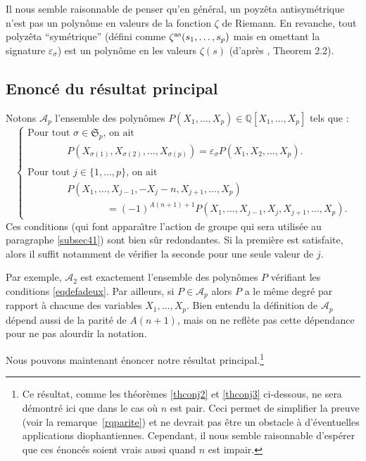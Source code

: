 \documentclass[12pt,francais, reqno]{smfart}
\numberwithin{equation}{section}
\newcommand{\Q}{\mathbb Q}
\newcommand{\eps}{\varepsilon}
\newcommand{\unp}{\{1,\ldots, p\}}
\newcommand{\zetaantisym}{\zeta^{{\rm as}}}
\begin{document}
\bigskip

Il nous semble raisonnable de penser qu'en g\'en\'eral, un poyz\^eta antisym\'etrique n'est pas un polyn\^ome en valeurs de la fonction $\zeta$ de Riemann. En revanche, tout polyz\^eta ``sym\'etrique'' (d\'efini comme $ \zetaantisym (s_1, \ldots, s_p)$ mais en omettant la signature $ \eps_{\sigma} $)
est un polyn\^ome en les valeurs $\zeta(s)$ (d'apr\`es \cite{Hoffman1992}, Theorem 2.2). 

\subsection{Enonc\'e du r\'esultat principal} \label{subsec22}

Notons   $\mathscr{A}_p$   l'ensemble des polyn\^omes 
$P(X_1, \ldots, X_p)\in\Q[X_1, \ldots, X_p]$  tels que :
$$
\begin{cases}
\mbox{Pour tout } \sigma \in\mathfrak{S}_p \mbox{,  on ait }  
\\
\qquad \qquad 
P(X_{\sigma(1)}, X_{\sigma(2)},\ldots, X_{\sigma(p)}) = \eps_{\sigma} P(X_1, X_2, \ldots, X_p). 
\\
\\
\mbox{Pour tout } j \in \unp \mbox{,  on ait}
\\ 
\qquad \qquad  P(X_1,\ldots, X_{j-1}, -X_j-n, X_{j+1}, \ldots, X_p ) 
\\
\qquad \qquad \qquad \qquad = (-1)^{A(n+1)+1} P( X_1,\ldots, X_{j-1}, X_j, X_{j+1}, \ldots, X_p ).
\end{cases}
$$
Ces conditions (qui font appara\^{\i}tre l'action de groupe qui sera utilis\'ee au paragraphe \ref{subsec41}) sont bien s\^ur redondantes. Si la premi\`ere est satisfaite, alors il suffit notamment  de v\'erifier la seconde pour une seule valeur  de $j$.

Par exemple, $\mathscr{A}_2$ est exactement l'ensemble des polyn\^omes $P$  v\'erifiant les conditions \eqref{eqdefadeux}. 
Par ailleurs, si $P \in \mathscr{A}_p$ alors $P$ a le m\^eme degr\'e par rapport \`a chacune des variables 
$X_1,   \ldots, X_p$. Bien entendu la d\'efinition de $\mathscr{A}_p$ d\'epend aussi de la 
parit\'e de $A(n+1)$, mais on ne refl\`ete pas cette d\'ependance pour ne pas alourdir la notation. 

\bigskip

Nous pouvons maintenant \'enoncer notre r\'esultat principal.\footnote{Ce r\'esultat, comme 
les th\'eor\`emes \ref{thconj2} et \ref{thconj3} ci-dessous, ne sera d\'emontr\'e ici que dans 
le cas o\`u  $n$ est pair. Ceci permet de simplifier la preuve (voir la remar\-que~\ref{rqparite})  
et ne devrait pas \^etre un obstacle \`a d'\'eventuelles applications diophantiennes. Cependant,  il nous semble raisonnable d'esp\'erer que ces \'enonc\'es soient vrais aussi quand $n$ est impair.}
\end{document}
